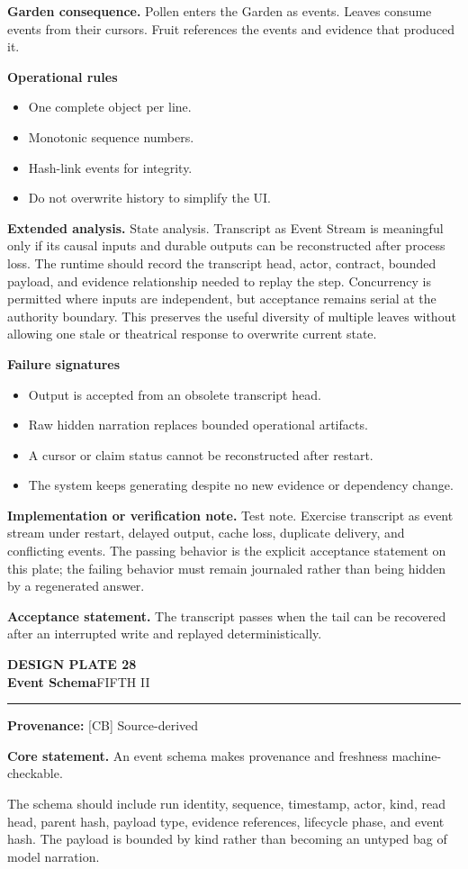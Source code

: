 \documentclass[10pt,letterpaper,oneside]{article}
\newcommand{\prov}[1]{\textcolor{gardenBlue}{\sffamily\footnotesize\textbf{Provenance:} #1}}
\newcommand{\platetitle}[3]{%
  \begin{minipage}[t][0.54in][t]{\textwidth}
  {\sffamily\bfseries\color{gardenDeep}\fontsize{9}{10}\selectfont DESIGN PLATE #1}\\[-1pt]
  {\sffamily\bfseries\color{gardenInk}\fontsize{16.5}{18}\selectfont #2}\hfill{\sffamily\color{gardenGreen}\large #3}
  \end{minipage}\vspace{-2pt}\hrule\vspace{5pt}}
\begin{document}
\textbf{Garden consequence.} Pollen enters the Garden as events. Leaves consume events from their cursors. Fruit references the events and evidence that produced it.

\textbf{Operational rules}
\begin{itemize}
\item One complete object per line.
\item Monotonic sequence numbers.
\item Hash-link events for integrity.
\item Do not overwrite history to simplify the UI.
\end{itemize}
\textbf{Extended analysis.} State analysis. Transcript as Event Stream is meaningful only if its causal inputs and durable outputs can be reconstructed after process loss. The runtime should record the transcript head, actor, contract, bounded payload, and evidence relationship needed to replay the step. Concurrency is permitted where inputs are independent, but acceptance remains serial at the authority boundary. This preserves the useful diversity of multiple leaves without allowing one stale or theatrical response to overwrite current state.

\textbf{Failure signatures}
\begin{itemize}
\item Output is accepted from an obsolete transcript head.
\item Raw hidden narration replaces bounded operational artifacts.
\item A cursor or claim status cannot be reconstructed after restart.
\item The system keeps generating despite no new evidence or dependency change.
\end{itemize}
\textbf{Implementation or verification note.} Test note. Exercise transcript as event stream under restart, delayed output, cache loss, duplicate delivery, and conflicting events. The passing behavior is the explicit acceptance statement on this plate; the failing behavior must remain journaled rather than being hidden by a regenerated answer.

\begin{acceptbox}
\textbf{Acceptance statement.} The transcript passes when the tail can be recovered after an interrupted write and replayed deterministically.
\end{acceptbox}
\newpage
\platetitle{28}{Event Schema}{FIFTH II}
\prov{[CB] Source-derived}
\fontsize{8.85}{10.45}\selectfont
\begin{corebox}
\textbf{Core statement.} An event schema makes provenance and freshness machine-checkable.
\end{corebox}
The schema should include run identity, sequence, timestamp, actor, kind, read head, parent hash, payload type, evidence references, lifecycle phase, and event hash. The payload is bounded by kind rather than becoming an untyped bag of model narration.
\end{document}
